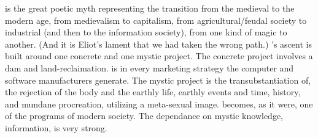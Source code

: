 is the great poetic myth representing
the transition from the medieval to the modern age, from medievalism to capitalism,
from agricultural\slash feudal society to industrial
(and then to the information society), from
one kind of magic to another. (And it is
Eliot's lament that we had taken the wrong
path.) 's ascent is built around one
concrete and one mystic project. The concrete project involves a dam and land-reclaimation. 
 is in every marketing strategy
the computer and software manufacturers
generate. The mystic project is the transubstantiation of, the rejection of the body and
the earthly life, earthly events and time,
history, and mundane procreation, utilizing
a meta-sexual image. 
becomes, as it were, one of the programs of modern society.
The dependance on mystic knowledge, information, is very strong.

